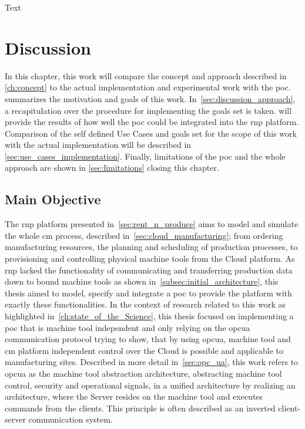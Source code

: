 \documentclass[
a4paper,
twoside,
headsepline,
cleardoublepage=empty,
parskip=half,
draft=false
]{scrbook}
\begin{document}
			Text

	\chapter{Discussion} \label{ch:discusion}

		In this chapter, this work will compare the concept and approach described in \cref{ch:concept} to the actual implementation and experimental work with the \gls{poc}.
		 summarizes the motivation and goals of this work.
		In~\cref{sec:discussion_approach}, a recapitulation over the procedure for implementing the goals set is taken. 
		 will provide the results of how well the \gls{poc} could be integrated into the \gls{rnp} platform. Comparison of the self defined Use Cases and goals set for the scope of this work with the actual implementation will be described in \cref{sec:use_cases_implementation}. Finally, limitations of the \gls{poc} and the whole approach are shown in \cref{sec:limitations} closing this chapter.
		
		\section{Main Objective}\label{sec:main_objective}
		
			The \gls{rnp} platform presented in~\cref{sec:rent_n_produce} aims to model and simulate the whole \gls{cm} process, described in~\cref{sec:cloud_manufacturing}; from ordering manufacturing resources, the planning and scheduling of production processes, to provisioning and controlling physical machine tools from the Cloud platform. As \gls{rnp} lacked the functionality of communicating and transferring production data down to bound machine tools as shown in~\cref{subsec:initial_architecture}, this thesis aimed to model, specify and integrate a \gls{poc} to provide the platform with exactly these functionalities. In the context of research related to this work as highlighted in~\cref{ch:state_of_the_Science}, this thesis focused on implementing a \gls{poc} that is machine tool independent and only relying on the \gls{opcua} communication protocol trying to show, that by using \gls{opcua}, machine tool and \gls{cm} platform independent control over the Cloud is possible and applicable to manufacturing sites. 
			Described in more detail in~\cref{sec:opc_ua}, this work refers to \gls{opcua} as the machine tool abstraction architecture, abstracting machine tool control, security and operational signals, in a unified architecture by realizing an architecture, where the Server resides on the machine tool and executes commands from the clients. This principle is often described as an inverted client-server communication system.
			
\end{document}
